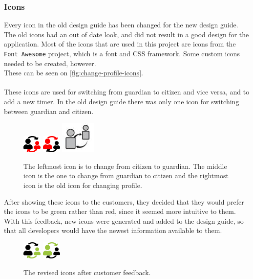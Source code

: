 \subsubsection{Icons}
Every icon in the old design guide has been changed for the new design guide.
The old icons had an out of date look, and did not result in a good design for the application.
Most of the icons that are used in this project are icons from the \texttt{Font Awesome} project, which is a font and CSS framework.
Some custom icons needed to be created, however. \\
These can be seen on \autoref{fig:change-profile-icons}. \\\\
These icons are used for switching from guardian to citizen and vice versa, and to add a new timer.
In the old design guide there was only one icon for switching between guardian and citizen.

\begin{figure}[htp]

    \centering
    \includegraphics[width=.1\textwidth]{figures/changeToGuardian}\hfill
    \includegraphics[width=.1\textwidth]{figures/changeToCitizen}\hfill
    \includegraphics[width=.1\textwidth]{figures/old-change-profile}
    
    \caption{ The leftmost icon is to change from citizen to guardian. The middle icon is the one to change from guardian to citizen and the rightmost icon is the old icon for changing profile.}
    \label{fig:change-profile-icons}
\end{figure}
\noindent
After showing these icons to the customers, they decided that they would prefer the icons to be green rather than red, since it seemed more intuitive to them.
With this feedback, new icons were generated and added to the design guide, so that all developers would have the newest information available to them.

\begin{figure}[htp]

    \centering
    \includegraphics[width=.1\textwidth]{figures/changeToGuardianGreen}\hfill
    \includegraphics[width=.1\textwidth]{figures/changeToCitizenGreen}
    
    \caption{The revised icons after customer feedback.}
    \label{fig:change-profile-icons-green}
\end{figure}
